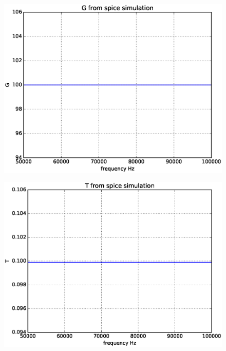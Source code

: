 \begin{enumerate}[label=\arabic*.,ref=\theenumi]
\begin{figure}[!ht]
\centering
\includegraphics[width=\columnwidth]{./figs/G1.eps}
\caption{}
\label{fig:ee18btech11041_fig9}
\end{figure}


\begin{figure}[!ht]
\centering
\includegraphics[width=\columnwidth]{./figs/T1.eps}
\caption{}
\label{fig:ee18btech11041_fig10}
\end{figure}


\end{enumerate}
